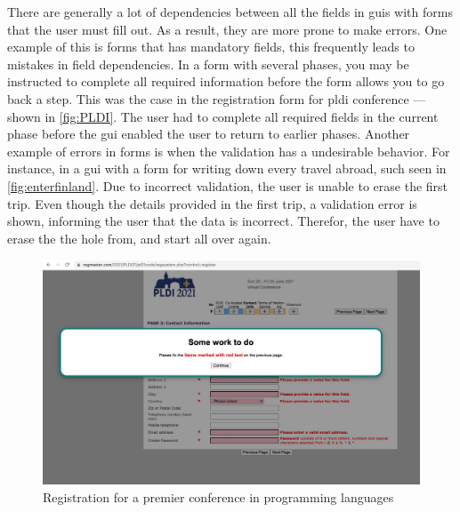 There are generally a lot of dependencies between all the fields in \gls{gui}s with forms that the user must fill out. As a result, they are more prone to make errors. One example of this is forms that has mandatory fields, this frequently leads to mistakes in field dependencies. In a form with several phases, you may be instructed to complete all required information before the form allows you to go back a step. This was the case in the registration form for \gls{pldi} conference --- shown in \autoref{fig:PLDI}. The user had to complete all required fields in the current phase before the \gls{gui} enabled the user to return to earlier phases. 
Another example of errors in forms is when the validation has a undesirable behavior. For instance, in a \gls{gui} with a form for writing down every travel abroad, such seen in \autoref{fig:enterfinland}. Due to incorrect validation, the user is unable to erase the first trip. Even though the details provided in the first trip, a validation error is shown, informing the user that the data is incorrect. Therefor, the user have to erase the the hole from, and start all over again.
\begin{figure}
    \centering
    \includegraphics[scale=0.2, frame]{figures/PLDI.jpg}
    \caption{Registration for a premier conference in programming languages}
    \label{fig:PLDI}
\end{figure}


